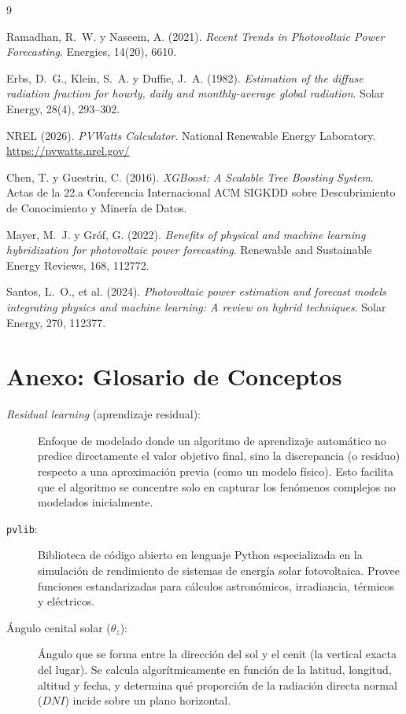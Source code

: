 \documentclass[12pt, letterpaper]{article}
\begin{document}

\newpage
\begin{thebibliography}{9}

Ramadhan, R.~W. y Naseem, A. (2021).
\textit{Recent Trends in Photovoltaic Power Forecasting}.
Energies, 14(20), 6610.

Erbs, D.~G., Klein, S.~A. y Duffie, J.~A. (1982).
\textit{Estimation of the diffuse radiation fraction for hourly, daily and monthly-average global radiation}.
Solar Energy, 28(4), 293--302.

NREL (2026).
\textit{PVWatts Calculator}.
National Renewable Energy Laboratory. \url{https://pvwatts.nrel.gov/}

Chen, T. y Guestrin, C. (2016).
\textit{XGBoost: A Scalable Tree Boosting System}.
Actas de la 22.a Conferencia Internacional ACM SIGKDD sobre Descubrimiento de Conocimiento y Miner\'ia de Datos.

Mayer, M.~J. y Gr\'of, G. (2022).
\textit{Benefits of physical and machine learning hybridization for photovoltaic power forecasting}.
Renewable and Sustainable Energy Reviews, 168, 112772.

Santos, L.~O., et al. (2024).
\textit{Photovoltaic power estimation and forecast models integrating physics and machine learning: A review on hybrid techniques}.
Solar Energy, 270, 112377.

\end{thebibliography}

\newpage
\appendix
\section{Anexo: Glosario de Conceptos}

\begin{description}
    \item[\textit{Residual learning} (aprendizaje residual):] Enfoque de modelado donde un algoritmo de aprendizaje autom\'atico no predice directamente el valor objetivo final, sino la discrepancia (o residuo) respecto a una aproximaci\'on previa (como un modelo f\'isico). Esto facilita que el algoritmo se concentre solo en capturar los fen\'omenos complejos no modelados inicialmente.
    \item[\texttt{pvlib}:] Biblioteca de c\'odigo abierto en lenguaje Python especializada en la simulaci\'on de rendimiento de sistemas de energ\'ia solar fotovoltaica. Provee funciones estandarizadas para c\'alculos astron\'omicos, irradiancia, t\'ermicos y el\'ectricos.
    \item[\'Angulo cenital solar (\(\theta_z\)):] \'Angulo que se forma entre la direcci\'on del sol y el cenit (la vertical exacta del lugar). Se calcula algor\'itmicamente en funci\'on de la latitud, longitud, altitud y fecha, y determina qu\'e proporci\'on de la radiaci\'on directa normal (\(DNI\)) incide sobre un plano horizontal.

\end{description}
\end{document}
